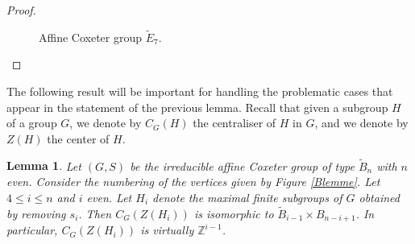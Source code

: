 \documentclass[a4paper, 11pt]{amsart}
\newtheorem{lemme}[te]{Lemma}
\theoremstyle{definition}
\theoremstyle{remark}
\renewcommand{\leq}{\leqslant}
\begin{document}
\begin{proof}
\begin{figure}[h!]
  \centering
  \caption{Affine Coxeter group $\tilde{E}_7$.}
  \label{E7lemme}
\end{figure}
\end{proof}

The following result will be important for handling the problematic cases that appear in the statement of the previous lemma. Recall that given a subgroup $H$ of a group $G$, we denote by $C_G(H)$ the centraliser of $H$ in $G$, and we denote by $Z(H)$ the center of $H$.

\begin{lemme}\label{keykey}
Let $(G,S)$ be the irreducible affine Coxeter group of type $\tilde{B}_n$ with $n$ even. Consider the numbering of the vertices given by Figure \ref{Blemme}. Let $4\leq i\leq n$ and $i$ even. Let $H_i$ denote the maximal finite subgroups of $G$ obtained by removing $s_i$. Then $C_G(Z(H_i))$ is isomorphic to $\tilde{B}_{i-1}\times B_{n-i+1}$. In particular, $C_G(Z(H_i))$ is virtually $\mathbb{Z}^{i-1}$.
\end{lemme}

\end{document}
